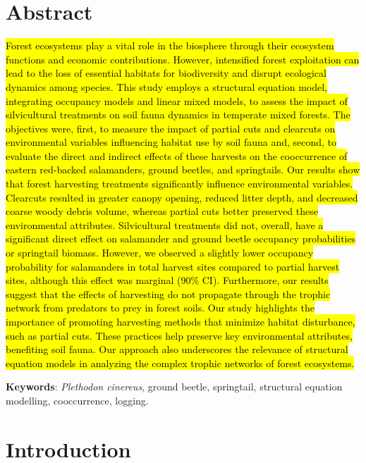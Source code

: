 \clearpage

\section*{Abstract}
\label{sec:abstract1}

\hl{Forest ecosystems play a vital role in the biosphere through their ecosystem functions and economic contributions. 
However, intensified forest exploitation can lead to the loss of essential habitats for biodiversity and disrupt ecological dynamics among species. 
This study employs a structural equation model, integrating occupancy models and linear mixed models, to assess the impact of silvicultural treatments on soil fauna dynamics in temperate mixed forests. 
The objectives were, first, to measure the impact of partial cuts and clearcuts on environmental variables influencing habitat use by soil fauna and, second, to evaluate the direct and indirect effects of these harvests on the cooccurrence of eastern red-backed salamanders, ground beetles, and springtails. 
Our results show that forest harvesting treatments significantly influence environmental variables. 
Clearcuts resulted in greater canopy opening, reduced litter depth, and decreased coarse woody debris volume, whereas partial cuts better preserved these environmental attributes. 
Silvicultural treatments did not, overall, have a significant direct effect on salamander and ground beetle occupancy probabilities or springtail biomass. 
However, we observed a slightly lower occupancy probability for salamanders in total harvest sites compared to partial harvest sites, although this effect was marginal (90\% CI). 
Furthermore, our results suggest that the effects of harvesting do not propagate through the trophic network from predators to prey in forest soils. 
Our study highlights the importance of promoting harvesting methods that minimize habitat disturbance, such as partial cuts. 
These practices help preserve key environmental attributes, benefiting soil fauna. 
Our approach also underscores the relevance of structural equation models in analyzing the complex trophic networks of forest ecosystems.}

\textbf{Keywords}: \textit{Plethodon cinereus}, ground beetle, springtail, structural equation modelling, cooccurrence, logging.


\cleardoublepage

\section*{Introduction}
\label{sec:intro1}

